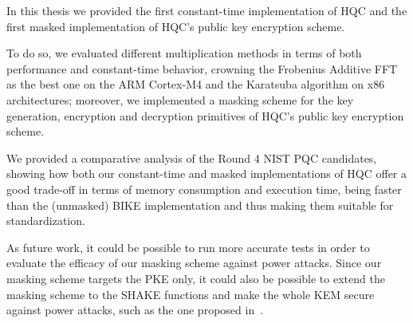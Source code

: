 In this thesis we provided the first constant-time implementation of HQC and the
first masked implementation of HQC's public key encryption scheme.

To do so, we evaluated different multiplication methods in terms of both performance and constant-time behavior, 
crowning the Frobenius Additive FFT as the best one on the ARM Cortex-M4 and the Karatsuba algorithm on x86 architectures;
moreover, we implemented a masking scheme for the key generation, encryption and decryption primitives
of HQC's public key encryption scheme.

We provided a comparative analysis of the Round 4 NIST PQC candidates, showing how both our constant-time and masked implementations 
of HQC offer a good trade-off in terms of memory consumption and execution time, being faster than the (unmasked) BIKE implementation
and thus making them suitable for standardization.

As future work, it could be possible to run more accurate tests in order to evaluate the efficacy of our masking scheme against power attacks.
Since our masking scheme targets the PKE only, it could also be possible to extend the masking scheme to 
the SHAKE functions and make the whole KEM secure against power attacks, such as the one proposed in~\cite{DBLP:journals/tches/UenoXTITH22}.
